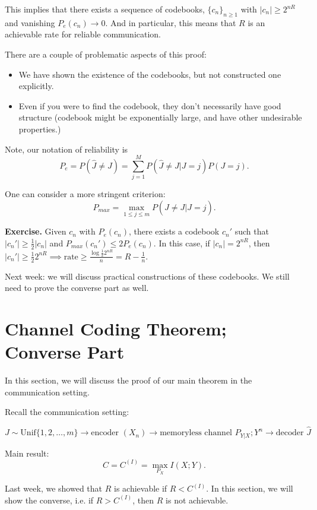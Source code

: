 \documentclass[12pt]{extarticle}
\newcommand{\T}{\text}
\def\Unif{\text{Unif}}
\begin{document}
This implies that there exists a sequence of codebooks, $\{ c_n \}_{n \geq 1}$ with $|c_n| \geq 2^{nR}$ and vanishing $P_e(c_n) \to 0$.  And in particular, this means that $R$ is an achievable rate for reliable communication. \ep

There are a couple of problematic aspects of this proof:

\begin{itemize}
  \item We have shown the existence of the codebooks, but not constructed one explicitly.
  \item Even if you were to find the codebook, they don't necessarily have good structure (codebook might be exponentially large, and have other undesirable properties.)
\end{itemize}

Note, our notation of reliability is
\[
  P_e = P(\hat{J} \neq J) = \sum_{j=1}^{M} P(\hat{J} \neq J | J = j) P(J = j).
\]

One can consider a more stringent criterion:
\[
  P_{max} = \max_{1 \leq j \leq m} P(\hat{J} \neq J | J = j).
\]

{\bf Exercise.} Given $c_n$ with $P_e (c_n)$, there exists a codebook $c_n'$ such that $|c_n'| \geq \frac{1}{2} |c_n|$ and $P_{max} (c_n') \leq 2 P_e (c_n)$.  In this case, if $|c_n| = 2^{nR}$, then $|c_n'| \geq \frac{1}{2} 2^{nR} \implies \T{rate} \geq \frac{\log \frac{1}{2} 2^{nR}}{n} = R - \frac{1}{n}.$

Next week: we will discuss practical constructions of these codebooks.  We still need to prove the converse part as well.


\section{Channel Coding Theorem; Converse Part}

In this section, we will discuss the proof of our main theorem in the communication setting.

Recall the communication setting:

\[
  J \sim \Unif\{1, 2, \dots, m \} \to \text{encoder $(X_n)$} \to \text{memoryless channel $P_{Y|X}; Y^n$} \to \text{decoder $\hat{J}$} 
\]

Main result:
\[
  C = C^{(I)} = \max_{P_X} I(X; Y).
\]

Last week, we showed that $R$ is achievable if $R < C^{(I)}$.  In this section, we will show the converse, i.e. if $R > C^{(I)}$, then $R$ is not achievable.
\end{document}
